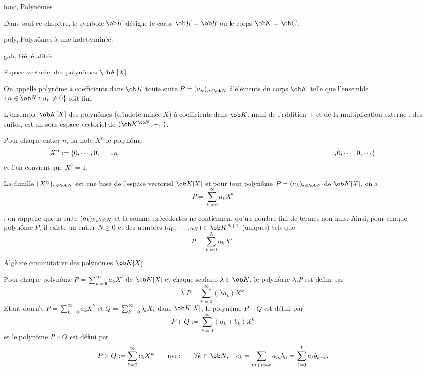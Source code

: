                 
         






\Chapter fonc, Polyn\^omes. 
\bigskip

\noindent
Dans tout ce chapitre, le symbole $\ob K$ d\'esigne le corps $\ob K=\ob R$ ou le corps $\ob K=\ob C$. 
\bigskip


\Section poly, Polyn\^omes \`a une indetermin\'ee. 

\Subsection gah, G\'en\'eralit\'es.

\Concept [] Espace vectoriel des polyn\^omes $\ob K[X]$

\Definition []  On appelle polyn\^ome \`a coefficients dans $\ob K$ toute suite $P=(a_n)_{n\in\ob N}$ d'\'el\'ements du corps $\ob K$ telle que l'ensemble 
$\{n\in\ob N:u_n\neq0\}$ soit fini.
\bigskip

\Propriete []  L'ensemble $\ob K[X]$ des polyn\^omes (d'indetermin\'ee $X$) \`a coefficients dans $\ob K$, muni de l'addition $+$ et de la multiplication externe $.$ des suites, est un sous espace vectoriel de $(\ob K^{\ob N},+,.)$. 
\bigskip

\Definition []  Pour chaque entier $n$, on note $X^n$ le polyn\^ome 
$$
X^n:=\{0,\cdots,0,\vtop{\mbox{$1$}\mbox{$n$}},0,\cdots,0,\cdots\}
$$
et l'on convient que $X^0=1$. 
\bigskip

\Propriete []  La famille $\{X^n\}_{n\in\ob N}$ est une base de l'espace vectoriel $\ob K[X]$ et pour tout polyn\^ome $P=(a_k)_{k\in\ob N}$ de $\ob K[X]$, on a 
$$
P=\sum_{k=0}^\infty a_kX^k
$$

\Remarque : on rappelle que la suite $(a_k)_{k\in\ob N}$ et la somme pr\'ec\'edentes ne contiennent qu'un nombre fini de termes non nuls. 
Ainsi, pour chaque polyn\^ome $P$, il existe un entier $N\ge0$ et des nombres $(a_0,\cdots,a_N)\in\ob K^{N+1}$ (uniques) tels que 
$$
P=\sum_{k=0}^Na_kX^k.
$$

\Concept [] Alg\`ebre commutative des polyn\^omes $\ob K[X]$ 


\Definition []  Pour chaque polyn\^ome $P=\sum_{k=0}^\infty a_kX^k$ de $\ob K[X]$ et chaque scalaire $\lambda\in\ob K$, le polyn\^ome $\lambda.P$ est d\'efini par 
$$
\lambda.P=\sum_{k=0}^\infty(\lambda a_k)X^k.
$$
Etant donn\'es $P=\sum_{k=0}^\infty a_kX^k$ et $Q=\sum_{k=0}^\infty b_kX_k$ dans $\ob K[X]$, 
le polyn\^ome $P+Q$ est d\'efini par 
$$
P+Q:=\sum_{k=0}^\infty(a_k+b_k)X^k
$$
et le polyn\^ome $P\times Q$ est d\'efini par
$$
P\times Q:=\sum_{k=0}^\infty c_kX^k\qquad \mbox{avec}\qquad \forall k\in\ob N, \quad c_k=\sum_{m+n=k}a_mb_n=\sum_{\ell=0}^ka_\ell b_{k-\ell}.
$$

